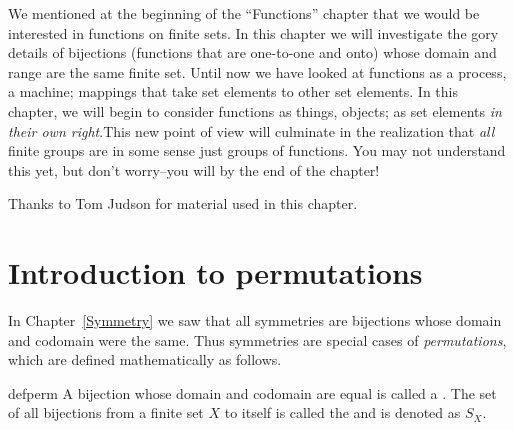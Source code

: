 We mentioned at the beginning of  the ``Functions'' chapter that we would be interested in functions on finite sets. In this chapter we will investigate the gory details of bijections (functions that are one-to-one and onto) whose domain and range are the same finite set. Until now we have looked at functions as a process, a machine; mappings that take set elements to other set elements. In this chapter, we will begin to consider functions as things, objects; as set elements \emph{in their own right}.This new point of view will culminate in the realization that \emph{all} finite groups are in some sense just groups of functions. You may not understand this yet, but don't worry--you will by the end of the chapter!
\bigskip


Thanks to Tom Judson for material used in this chapter.

\section{Introduction to permutations}
\label{sec:Permutations:Introduction}

In Chapter~\ref{Symmetry} we saw that all symmetries are  bijections whose domain and codomain were the same.  Thus symmetries are special cases of \emph{permutations}, which are defined mathematically as follows.

\begin{defn}{defperm}
A bijection whose domain and codomain are equal is called a . The set of all bijections from a finite set $X$ to itself is called the  and is denoted as $S_X$.
\end{defn}


